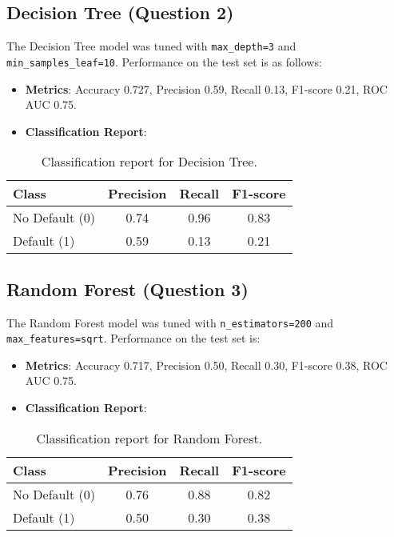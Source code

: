 \documentclass[a4paper,12pt,headsepline]{scrartcl} %
\begin{document}
\subsection{Decision Tree (Question 2)}
The Decision Tree model was tuned with \texttt{max\_depth=3} and \texttt{min\_samples\_leaf=10}. Performance on the test set is as follows:
\begin{itemize}
    \item \textbf{Metrics}: Accuracy 0.727, Precision 0.59, Recall 0.13, F1-score 0.21, ROC AUC 0.75.
    \item \textbf{Classification Report}:
\end{itemize}

\begin{table}[h]
\centering
\begin{tabular}{lccc}
\toprule
Class & Precision & Recall & F1-score \\
\midrule
No Default (0) & 0.74 & 0.96 & 0.83 \\
Default (1) & 0.59 & 0.13 & 0.21 \\
\bottomrule
\end{tabular}
\caption{Classification report for Decision Tree.}
\label{tab:dt_classification}
\end{table}

\subsection{Random Forest (Question 3)}
The Random Forest model was tuned with \texttt{n\_estimators=200} and \texttt{max\_features=sqrt}. Performance on the test set is:
\begin{itemize}
    \item \textbf{Metrics}: Accuracy 0.717, Precision 0.50, Recall 0.30, F1-score 0.38, ROC AUC 0.75.
    \item \textbf{Classification Report}:
\end{itemize}

\begin{table}[h]
\centering
\begin{tabular}{lccc}
\toprule
Class & Precision & Recall & F1-score \\
\midrule
No Default (0) & 0.76 & 0.88 & 0.82 \\
Default (1) & 0.50 & 0.30 & 0.38 \\
\bottomrule
\end{tabular}
\caption{Classification report for Random Forest.}
\label{tab:rf_classification}
\end{table}
\end{document}
